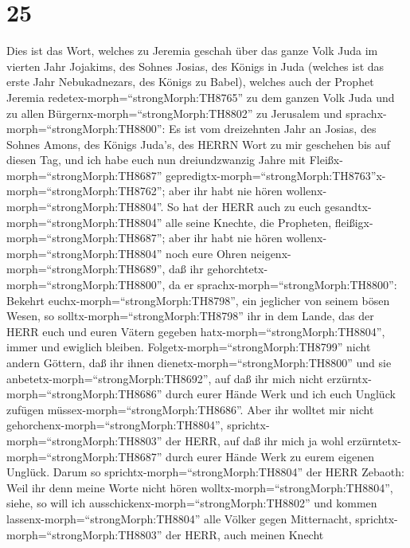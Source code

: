 \hypertarget{section-24}{%
\section{25}\label{section-24}}

 Dies ist das Wort, welches zu Jeremia geschah über das
ganze Volk Juda im vierten Jahr Jojakims, des Sohnes Josias, des Königs
in Juda (welches ist das erste Jahr Nebukadnezars, des Königs zu Babel),
 welches auch der Prophet Jeremia
redetex-morph=``strongMorph:TH8765'' zu dem ganzen Volk Juda und zu
allen Bürgernx-morph=``strongMorph:TH8802'' zu Jerusalem und
sprachx-morph=``strongMorph:TH8800'':  Es ist vom
dreizehnten Jahr an Josias, des Sohnes Amons, des Königs Juda's, des
HERRN Wort zu mir geschehen bis auf diesen Tag, und ich habe euch nun
dreiundzwanzig Jahre mit Fleißx-morph=``strongMorph:TH8687''
gepredigtx-morph=``strongMorph:TH8763''x-morph=``strongMorph:TH8762'';
aber ihr habt nie hören wollenx-morph=``strongMorph:TH8804''.
 So hat der HERR auch zu euch
gesandtx-morph=``strongMorph:TH8804'' alle seine Knechte, die Propheten,
fleißigx-morph=``strongMorph:TH8687''; aber ihr habt nie hören
wollenx-morph=``strongMorph:TH8804'' noch eure Ohren
neigenx-morph=``strongMorph:TH8689'', daß ihr
gehorchtetx-morph=``strongMorph:TH8800'',  da er
sprachx-morph=``strongMorph:TH8800'': Bekehrt
euchx-morph=``strongMorph:TH8798'', ein jeglicher von seinem bösen
Wesen, so solltx-morph=``strongMorph:TH8798'' ihr in dem Lande, das der
HERR euch und euren Vätern gegeben hatx-morph=``strongMorph:TH8804'',
immer und ewiglich bleiben. 
Folgetx-morph=``strongMorph:TH8799'' nicht andern Göttern, daß ihr ihnen
dienetx-morph=``strongMorph:TH8800'' und sie
anbetetx-morph=``strongMorph:TH8692'', auf daß ihr mich nicht
erzürntx-morph=``strongMorph:TH8686'' durch eurer Hände Werk und ich
euch Unglück zufügen müssex-morph=``strongMorph:TH8686''. 
Aber ihr wolltet mir nicht gehorchenx-morph=``strongMorph:TH8804'',
sprichtx-morph=``strongMorph:TH8803'' der HERR, auf daß ihr mich ja wohl
erzürntetx-morph=``strongMorph:TH8687'' durch eurer Hände Werk zu eurem
eigenen Unglück.  Darum so
sprichtx-morph=``strongMorph:TH8804'' der HERR Zebaoth: Weil ihr denn
meine Worte nicht hören wolltx-morph=``strongMorph:TH8804'',
 siehe, so will ich
ausschickenx-morph=``strongMorph:TH8802'' und kommen
lassenx-morph=``strongMorph:TH8804'' alle Völker gegen Mitternacht,
sprichtx-morph=``strongMorph:TH8803'' der HERR, auch meinen Knecht

